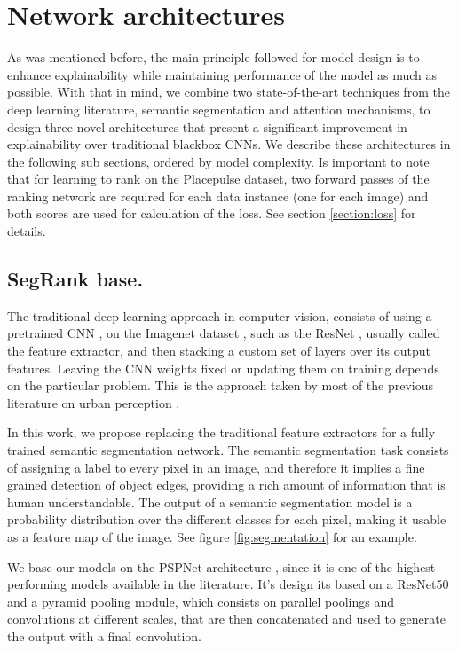 \section{Network architectures}
\label{sec:nn_arch}
As was mentioned before, the main principle followed for model design is to enhance explainability
while maintaining performance of the model as much as possible. With that in mind, we combine two
state-of-the-art techniques from the deep learning literature, semantic segmentation
and attention mechanisms, to design three novel architectures that present a significant
improvement in explainability over traditional blackbox CNNs. We describe these architectures
in the following sub sections, ordered by model complexity. Is important to note that
for learning to rank on the Placepulse dataset,
two forward passes of the ranking  network are required for each data instance (one for each image) and both scores are used
for calculation of the loss. See section \ref{section:loss} for  details.


\subsection{SegRank base.}
The traditional deep learning approach in computer vision, consists of using a pretrained
CNN \cite{lecun_mnist}, on the Imagenet dataset \cite{imagenet}, such as the ResNet \cite{he_resnet},
usually called the feature extractor, and then stacking a custom set of layers over its output features. Leaving the CNN weights
fixed or updating them on training  depends on the particular problem. This is the approach taken
by most of the previous literature on urban perception \cite{hidalgo_placepulse,tamara_judgments,zhang_measuring}.

In this work, we propose replacing the traditional feature extractors for a fully trained semantic segmentation
network. The semantic segmentation task consists of assigning a label to every pixel in an image, and therefore
it implies a fine grained detection of object edges, providing a rich amount of information that is human understandable.
The output of a semantic segmentation model is a probability distribution over the different classes for each pixel,
making it usable as a feature map of the image. See figure \ref{fig:segmentation} for an example.

We base our models on the PSPNet architecture \cite{pspnet}, since it is one of the highest performing models
available in the literature. It's design its based on a ResNet50 and a pyramid pooling module, which consists on
parallel poolings and convolutions at different scales, that are then concatenated and used to generate the output with a
final convolution.

